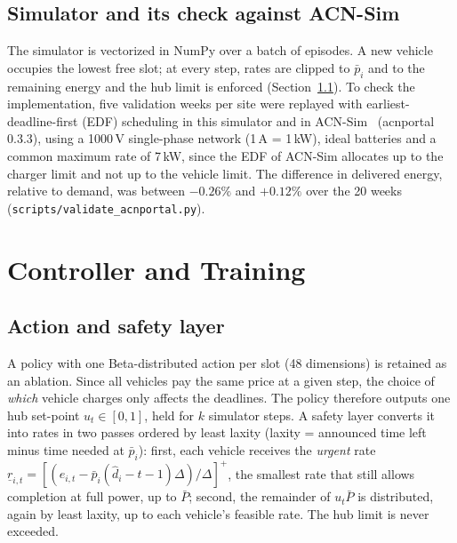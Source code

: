 \documentclass[conference]{IEEEtran}
\begin{document}
\subsection{Simulator and its check against ACN-Sim}
The simulator is vectorized in NumPy over a batch of episodes. A new vehicle occupies the lowest
free slot; at every step, rates are clipped to $\bar p_i$ and to the remaining energy and the hub
limit is enforced (Section~\ref{sec:safety}). To check the implementation, five validation weeks
per site were replayed with earliest-deadline-first (EDF) scheduling in this simulator and in
ACN-Sim~\cite{lee2021acnsim} (acnportal 0.3.3), using a 1000\,V single-phase network (1\,A = 1\,kW),
ideal batteries and a common maximum rate of 7\,kW, since the EDF of ACN-Sim allocates up to the
charger limit and not up to the vehicle limit. The difference in delivered energy, relative to
demand, was between $-0.26\%$ and $+0.12\%$ over the 20 weeks (\texttt{scripts/validate\_acnportal.py}).

\section{Controller and Training}
\subsection{Action and safety layer}\label{sec:safety}
A policy with one Beta-distributed action per slot (48 dimensions) is retained as an ablation. Since all vehicles
pay the same price at a given step, the choice of \emph{which} vehicle charges only affects the
deadlines. The policy therefore outputs one hub set-point $u_t\in[0,1]$, held for $k$ simulator
steps. A safety layer converts it into rates in two passes ordered by least laxity
(laxity = announced time left minus time needed at $\bar p_i$): first, each vehicle receives the
\emph{urgent} rate
$\underline r_{i,t}=[(e_{i,t}-\bar p_i(\hat d_i-t-1)\Delta)/\Delta]^+$, the smallest rate that still
allows completion at full power, up to $\bar P$; second, the remainder of $u_t\bar P$ is distributed,
again by least laxity, up to each vehicle's feasible rate. The hub limit is never exceeded.
\end{document}

